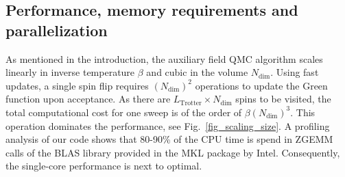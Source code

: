 \subsection{Performance, memory requirements and parallelization} \label{sec:performance}
%

As mentioned in the  introduction, the auxiliary field QMC algorithm scales linearly in inverse temperature $\beta$ and cubic in the volume $N_{\text{dim}}$. Using fast updates,  a single spin flip  requires $(N_{\text{dim}})^2$ operations to update the Green function upon acceptance.  As there are $L_{\text{Trotter}}\times N_{\text{dim}}$ spins to be visited, the total computational cost for one sweep is of the order of $\beta (N_{\text{dim}})^3$. This operation  dominates the performance, see Fig.~\ref{fig_scaling_size}. A profiling analysis of our code shows that 80-90\% of the CPU time is spend in ZGEMM calls of the BLAS library provided in the MKL package by Intel. Consequently, the single-core performance is next to optimal.

